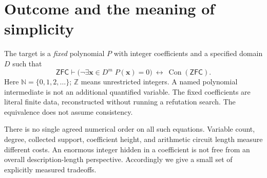 \documentclass[11pt]{article}
\newcommand{\N}{\mathbb N}
\newcommand{\Z}{\mathbb Z}
\newcommand{\Con}{\operatorname{Con}}
\newcommand{\ZFC}{\mathsf{ZFC}}
\theoremstyle{definition}\newtheorem{definition}[theorem]{Definition}
\theoremstyle{remark}\newtheorem{remark}[theorem]{Remark}
\begin{document}
\begin{abstract}
We construct and export new fixed polynomial equations whose absence of
solutions is equivalent, by ordinary arguments formalizable in ZFC and the
retained source calibration, to $\Con(\ZFC)$. The direct proof-certificate
route has 319 nonnegative variables, degree four, 254 quadratic residuals,
10,283 collected monomials, and coefficient height 86,842,335. It improves
the inspected 349-variable endpoint in variables, residuals, terms, and
height. Its architecture needs only six full power certificates instead
of nineteen: a single exact binomial serves both the factorial and the
reciprocal CRT product, while common Pell residues handle eleven digit
requests. This route does not simulate K215 or specialize Jones's universal
polynomial.

A complementary native-source construction uses eleven unrestricted
integer variables. A coprime product is absorbed into the strong Pell
coefficient; congruences modulo four recover positivity of the extracted
factors. Together with a short powered-divisibility carrier this gives
degree 966 at 111 operations, or degree 882 at 112 operations. A three-root
companion gives degree 464 at 125 operations and degree 440 at 126
operations. The report supplies the mathematical definitions, both
directions of the new reductions, the exact degree arguments, the
coefficient conventions, and a reproducible audit. Existing lemmas and
unbounded source theorems are credited explicitly.
\end{abstract}
\tableofcontents
\newpage

\section{Outcome and the meaning of simplicity}
The target is a \emph{fixed} polynomial $P$ with integer coefficients and
a specified domain $D$ such that
\begin{equation}\label{eq:goal}
 \ZFC\vdash
 \bigl(\neg\exists\mathbf x\in D^m\; P(\mathbf x)=0\bigr)
 \ \longleftrightarrow\ \Con(\ZFC).
\end{equation}
Here $\N=\{0,1,2,\ldots\}$; $\Z$ means unrestricted integers. A named
polynomial intermediate is not an additional quantified variable.
The fixed coefficients are literal finite data, reconstructed without
running a refutation search. The equivalence does not assume consistency.

There is no single agreed numerical order on all such equations. Variable
count, degree, collected support, coefficient height, and arithmetic
circuit length measure different costs. An enormous integer hidden in a
coefficient is not free from an overall description-length perspective.
Accordingly we give a small set of explicitly measured tradeoffs.
\end{document}
